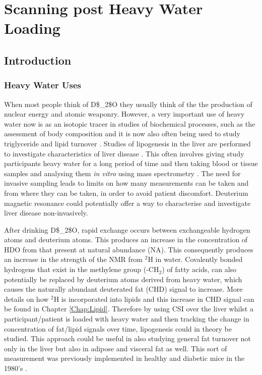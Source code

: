 \chapter{Scanning post Heavy Water Loading}
\label{Chap:D2O}

\section{Introduction}

\subsection{Heavy Water Uses}

When most people think of \ac{D$_2$O} they usually think of the the production of nuclear energy and atomic weaponry. However, a very important use of heavy water now is as an isotopic tracer in studies of biochemical processes, such as the assessment of body composition \cite{INTERNATIONALATOMICENERGYAGENCY2011IntroductionSpectrometry} and it is now also often being used to study triglyceride \cite{Strawford2004AdiposeO} and lipid turnover \cite{Wilkinson2017StableFuture}. Studies of lipogenesis in the liver are performed to investigate characteristics of liver disease \cite{Turner2003MeasurementMIDA}. This often involves giving study participants heavy water for a long period of time and then taking blood or tissue samples and analysing them \textit{in vitro} using mass spectrometry \cite{Lawitz2022ElevatedPatients, Diraison1997MeasuringTechniques}. The need for invasive sampling leads to limits on how many measurements can be taken and from where they can be taken, in order to avoid patient discomfort. Deuterium magnetic resonance could potentially offer a way to characterise and investigate liver disease non-invasively. 

After drinking \ac{D$_2$O}, rapid exchange occurs between exchangeable hydrogen atoms and deuterium atoms. This produces an increase in the concentration of \ac{HDO} from that present at natural abundance (NA). This consequently produces an increase in the strength of the \ac{NMR} from $^2$H in water. Covalently bonded hydrogens that exist in the methylene group (-CH$_2$) of fatty acids, can also potentially be replaced by deuterium atoms derived from heavy water, which causes the naturally abundant deuterated fat (CHD) signal to increase. More details on how $^2$H is incorporated into lipids and this increase in CHD signal can be found in Chapter \ref{Chap:Lipid}. Therefore by using \ac{CSI} over the liver whilst a participant/patient is loaded with heavy water and then tracking the change in concentration of fat/lipid signals over time, lipogenesis could in theory be studied. This approach could be useful in also studying general fat turnover not only in the liver but also in adipose and visceral fat as well. This sort of measurement was previously implemented in healthy and diabetic mice in the 1980's \cite{Brereton1986PreliminarySpectroscopy,Brereton1989TheMice}.

